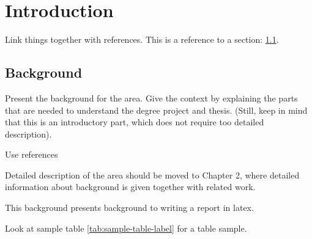 \section{Introduction}

Link things together with references. This is a reference to a section: \ref{sec:background}.

\subsection{Background}
\label{sec:background}
Present the background for the area. Give the context by explaining the parts that are needed to understand the degree project and thesis. (Still, keep in mind that this is an introductory part, which does not require too detailed description).

Use references

Detailed description of the area should be moved to Chapter 2, where detailed information about background is given together with related work. 

This background presents background to writing a report in latex.

Look at sample table \ref{tab:sample-table-label} for a table sample.



